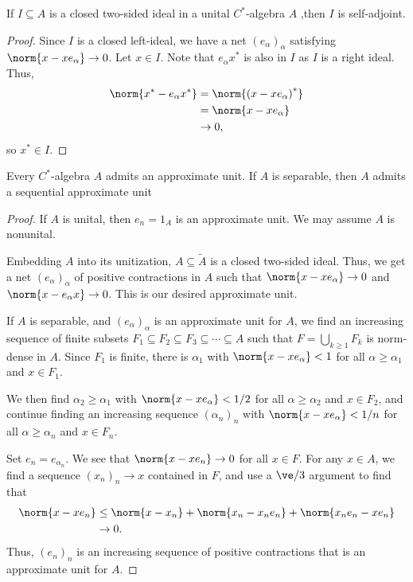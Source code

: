 \documentclass[10pt]{mypackage}
\begin{document}
\begin{corollary}
  If $I\subseteq A$ is a closed two-sided ideal in a unital $C^{\ast}$-algebra $A$ ,then $I$ is self-adjoint.
\end{corollary}
\begin{proof}
  Since $I$ is a closed left-ideal, we have a net $\left(e_{\alpha}\right)_{\alpha}$ satisfying $\norm{x - xe_{\alpha}}\rightarrow 0$. Let $x\in I$. Note that $e_{\alpha}x^{\ast}$ is also in $I$ as $I$ is a right ideal. Thus,
  \begin{align*}
    \norm{x^{\ast}-e_{\alpha}x^{\ast}} &= \norm{\left(x-xe_{\alpha}\right)^{\ast}}\\
                                       &= \norm{x-xe_{\alpha}}\\
                                       &\rightarrow 0,
  \end{align*}
  so $x^{\ast}\in I$.
\end{proof}
\begin{theorem}
  Every $C^{\ast}$-algebra $A$ admits an approximate unit. If $A$ is separable, then $A$ admits a sequential approximate unit
\end{theorem}
\begin{proof}
  If $A$ is unital, then $e_n = 1_A$ is an approximate unit. We may assume $A$ is nonunital.\newline

  Embedding $A$ into its unitization, $A\subseteq \widetilde{A}$ is a closed two-sided ideal. Thus, we get a net $\left(e_{\alpha}\right)_{\alpha}$ of positive contractions in $A$ such that $\norm{x-xe_{\alpha}}\rightarrow 0$ and $\norm{x-e_{\alpha}x}\rightarrow 0$. This is our desired approximate unit.\newline

  If $A$ is separable, and $\left(e_{\alpha}\right)_{\alpha}$ is an approximate unit for $A$, we find an increasing sequence of finite subsets $F_1\subseteq F_2\subseteq F_3\subseteq \cdots \subseteq A$ such that $F = \bigcup_{k\geq 1}F_k$ is norm-dense in $A$. Since $F_1$ is finite, there is $\alpha_1$ with $\norm{x-xe_{\alpha}} < 1$ for all $\alpha \geq \alpha_1$ and $x\in F_1$.\newline

  We then find $\alpha_2 \geq \alpha_1$ with $\norm{x-xe_{\alpha}} < 1/2$ for all $\alpha \geq \alpha_2$ and $x\in F_2$, and continue finding an increasing sequence $\left(\alpha_n\right)_n$ with $\norm{x-xe_{\alpha}} < 1/n$ for all $\alpha \geq \alpha_n$ and $x\in F_n$.\newline

  Set $e_n = e_{\alpha_n}$. We see that $\norm{x-xe_n}\rightarrow 0$ for all $x\in F$. For any $x\in A$, we find a sequence $\left(x_n\right)_n\rightarrow x$ contained in $F$, and use a $\ve/3$ argument to find that
  \begin{align*}
    \norm{x-xe_n} &\leq \norm{x-x_n} + \norm{x_n - x_ne_n} + \norm{x_ne_n - xe_n}\\
                  &\rightarrow 0.
  \end{align*}
  Thus, $\left(e_n\right)_n$ is an increasing sequence of positive contractions that is an approximate unit for $A$.
\end{proof}
\end{document}
